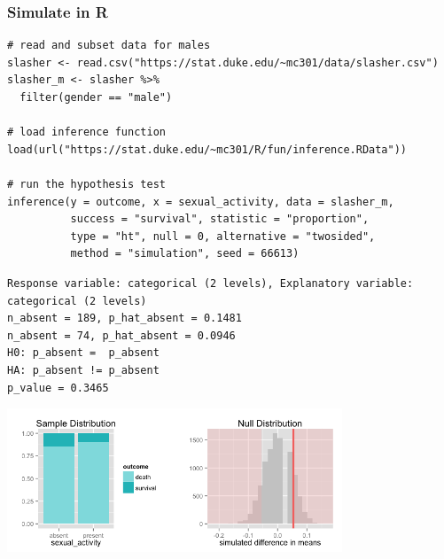 \documentclass[slidestop,compress,mathserif,12pt,t,professionalfonts,xcolor=table]{beamer}
\begin{document}

\begin{frame}[fragile]
\frametitle{Simulate in R}

\vspace{-0.25cm}

{\tiny
\begin{Verbatim}[frame=single, formatcom=\color{blue}]
# read and subset data for males
slasher <- read.csv("https://stat.duke.edu/~mc301/data/slasher.csv")
slasher_m <- slasher %>%
  filter(gender == "male")
  
# load inference function
load(url("https://stat.duke.edu/~mc301/R/fun/inference.RData"))

# run the hypothesis test
inference(y = outcome, x = sexual_activity, data = slasher_m,
          success = "survival", statistic = "proportion", 
          type = "ht", null = 0, alternative = "twosided", 
          method = "simulation", seed = 66613)
\end{Verbatim}
}

\pause

{\tiny
\begin{Verbatim}[frame=single, formatcom=\color{gray}]
Response variable: categorical (2 levels), Explanatory variable: categorical (2 levels) 
n_absent = 189, p_hat_absent = 0.1481
n_absent = 74, p_hat_absent = 0.0946
H0: p_absent =  p_absent
HA: p_absent != p_absent
p_value = 0.3465
\end{Verbatim}
}

\includegraphics[width=0.75\textwidth]{figures/slasher/male_rand}

\end{frame}


\begin{frame}

\vfill


\vfill

\end{frame}
\end{document}
